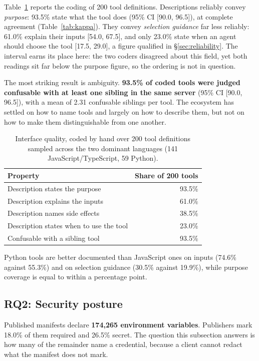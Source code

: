 \documentclass[a4paper,fleqn]{cas-dc}
\begin{document}
Table~\ref{tab:rq1} reports the coding of 200 tool definitions. Descriptions
reliably convey \emph{purpose}: 93.5\% state what the tool does (95\% CI
[90.0, 96.5]), at complete agreement (Table~\ref{tab:kappa}). They convey
\emph{selection guidance} far less reliably: 61.0\% explain their inputs
[54.0, 67.5], and only 23.0\% state when an agent should choose the tool
[17.5, 29.0], a figure qualified in \S\ref{sec:reliability}. The interval
earns its place here: the two coders disagreed about this field, yet both
readings sit far below the purpose figure, so the ordering is not in question.

The most striking result is ambiguity. \textbf{93.5\% of coded tools were judged
confusable with at least one sibling in the same server} (95\% CI
[90.0, 96.5]), with a mean of 2.31
confusable siblings per tool. The ecosystem has settled on how to name tools
and largely on how to describe them, but not on how to make them
distinguishable from one another.

\begin{table}[t]
\caption{Interface quality, coded by hand over 200 tool definitions sampled
across the two dominant languages (141 JavaScript/TypeScript, 59 Python).}
\label{tab:rq1}
\centering
\begin{tabular}{@{}lr@{}}
\toprule
Property & Share of 200 tools \\
\midrule
Description states the purpose & 93.5\% \\
Description explains the inputs & 61.0\% \\
Description names side effects & 38.5\% \\
Description states when to use the tool & 23.0\% \\
Confusable with a sibling tool & 93.5\% \\
\bottomrule
\end{tabular}
\end{table}

Python tools are better documented than JavaScript ones on inputs (74.6\%
against 55.3\%) and on selection guidance (30.5\% against 19.9\%), while
purpose coverage is equal to within a percentage point.

\subsection{RQ2: Security posture}\label{sec:rq2}

Published manifests declare \textbf{174,265 environment variables}. Publishers
mark 18.0\% of them required and 26.5\% secret. The question this subsection
answers is how many of the remainder name a credential, because a client cannot
redact what the manifest does not mark.
\end{document}
